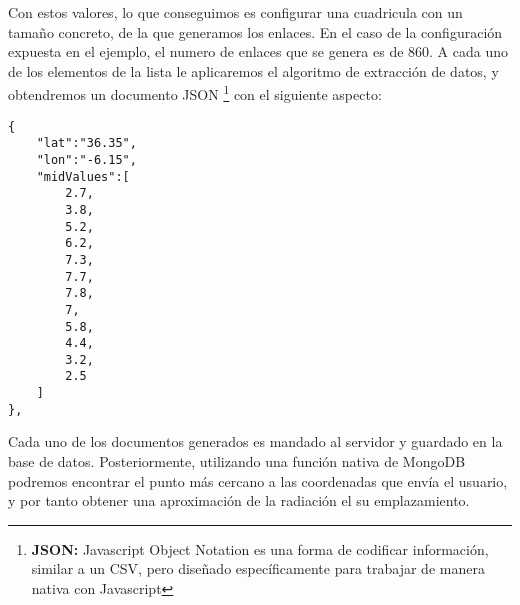 Con estos valores, lo que conseguimos es configurar una cuadricula con un tamaño concreto, de la que generamos los enlaces. En el caso de la configuración expuesta en el ejemplo, el numero de enlaces que se genera es de 860. A cada uno de los elementos de la lista le aplicaremos el algoritmo de extracción de datos, y obtendremos un documento JSON \footnote{\textbf{JSON:} Javascript Object Notation es una forma de codificar información, similar a un CSV, pero diseñado específicamente para trabajar de manera nativa con Javascript} con el siguiente aspecto:

\begin{lstlisting}[style=ES6, caption={Ejemplo de un documento JSON con la información de un punto concreto \label{code:json_example}}]
{
    "lat":"36.35",
    "lon":"-6.15",
    "midValues":[
        2.7,
        3.8,
        5.2,
        6.2,
        7.3,
        7.7,
        7.8,
        7,
        5.8,
        4.4,
        3.2,
        2.5
    ]
},
\end{lstlisting}

Cada uno de los documentos generados es mandado al servidor y guardado en la base de datos. Posteriormente, utilizando una función nativa de MongoDB podremos encontrar el punto más cercano a las coordenadas que envía el usuario, y por tanto obtener una aproximación de la radiación el su emplazamiento.




